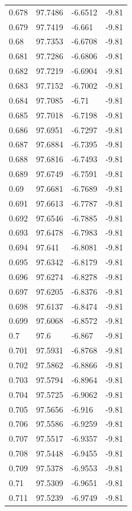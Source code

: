 \begin{tabular}{llll}
0.678 & 97.7486 & -6.6512 & -9.81 \\
0.679 & 97.7419 & -6.661 & -9.81 \\
0.68 & 97.7353 & -6.6708 & -9.81 \\
0.681 & 97.7286 & -6.6806 & -9.81 \\
0.682 & 97.7219 & -6.6904 & -9.81 \\
0.683 & 97.7152 & -6.7002 & -9.81 \\
0.684 & 97.7085 & -6.71 & -9.81 \\
0.685 & 97.7018 & -6.7198 & -9.81 \\
0.686 & 97.6951 & -6.7297 & -9.81 \\
0.687 & 97.6884 & -6.7395 & -9.81 \\
0.688 & 97.6816 & -6.7493 & -9.81 \\
0.689 & 97.6749 & -6.7591 & -9.81 \\
0.69 & 97.6681 & -6.7689 & -9.81 \\
0.691 & 97.6613 & -6.7787 & -9.81 \\
0.692 & 97.6546 & -6.7885 & -9.81 \\
0.693 & 97.6478 & -6.7983 & -9.81 \\
0.694 & 97.641 & -6.8081 & -9.81 \\
0.695 & 97.6342 & -6.8179 & -9.81 \\
0.696 & 97.6274 & -6.8278 & -9.81 \\
0.697 & 97.6205 & -6.8376 & -9.81 \\
0.698 & 97.6137 & -6.8474 & -9.81 \\
0.699 & 97.6068 & -6.8572 & -9.81 \\
0.7 & 97.6 & -6.867 & -9.81 \\
0.701 & 97.5931 & -6.8768 & -9.81 \\
0.702 & 97.5862 & -6.8866 & -9.81 \\
0.703 & 97.5794 & -6.8964 & -9.81 \\
0.704 & 97.5725 & -6.9062 & -9.81 \\
0.705 & 97.5656 & -6.916 & -9.81 \\
0.706 & 97.5586 & -6.9259 & -9.81 \\
0.707 & 97.5517 & -6.9357 & -9.81 \\
0.708 & 97.5448 & -6.9455 & -9.81 \\
0.709 & 97.5378 & -6.9553 & -9.81 \\
0.71 & 97.5309 & -6.9651 & -9.81 \\
0.711 & 97.5239 & -6.9749 & -9.81 \\

\end{tabular}
